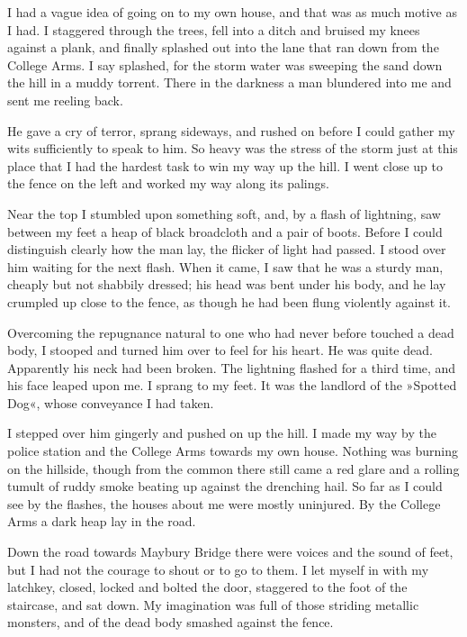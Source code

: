 

I had a vague idea of going on to my own house, and that was as much motive as I had. I staggered through the trees, fell into a ditch and bruised my knees against a plank, and finally splashed out into the lane that ran down from the College Arms. I say splashed, for the storm water was sweeping the sand down the hill in a muddy torrent. There in the darkness a man blundered into me and sent me reeling back.

He gave a cry of terror, sprang sideways, and rushed on before I could gather my wits sufficiently to speak to him. So heavy was the stress of the storm just at this place that I had the hardest task to win my way up the hill. I went close up to the fence on the left and worked my way along its palings.

Near the top I stumbled upon something soft, and, by a flash of lightning, saw between my feet a heap of black broadcloth and a pair of boots. Before I could distinguish clearly how the man lay, the flicker of light had passed. I stood over him waiting for the next flash. When it came, I saw that he was a sturdy man, cheaply but not shabbily dressed; his head was bent under his body, and he lay crumpled up close to the fence, as though he had been flung violently against it.

Overcoming the repugnance natural to one who had never before touched a dead body, I stooped and turned him over to feel for his heart. He was quite dead. Apparently his neck had been broken. The lightning flashed for a third time, and his face leaped upon me. I sprang to my feet. It was the landlord of the »Spotted Dog«, whose conveyance I had taken.

I stepped over him gingerly and pushed on up the hill. I made my way by the police station and the College Arms towards my own house. Nothing was burning on the hillside, though from the common there still came a red glare and a rolling tumult of ruddy smoke beating up against the drenching hail. So far as I could see by the flashes, the houses about me were mostly uninjured. By the College Arms a dark heap lay in the road.

Down the road towards Maybury Bridge there were voices and the sound of feet, but I had not the courage to shout or to go to them. I let myself in with my latchkey, closed, locked and bolted the door, staggered to the foot of the staircase, and sat down. My imagination was full of those striding metallic monsters, and of the dead body smashed against the fence.



